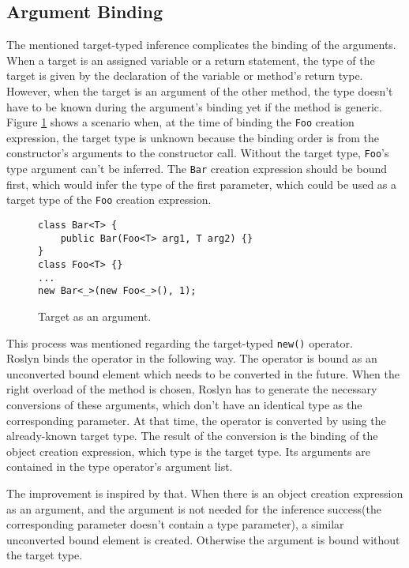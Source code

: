 \subsection{Argument Binding}

The mentioned target-typed inference complicates the binding of the arguments. 
When a target is an assigned variable or a return statement, the type of the target is given by the declaration of the variable or method’s return type. 
However, when the target is an argument of the other method, the type doesn’t have to be known during the argument's binding yet if the method is generic. 
Figure \ref{img60:target} shows a scenario when, at the time of binding the \texttt{Foo} creation expression, the target type is unknown because the binding order is from the constructor’s arguments to the constructor call. 
Without the target type, \texttt{Foo}'s type argument can’t be inferred. 
The \texttt{Bar} creation expression should be bound first, which would infer the type of the first parameter, which could be used as a target type of the \texttt{Foo} creation expression.
\begin{figure}[h!]
\begin{lstlisting}[style=csharp, mathescape=true]
class Bar<T> {
    public Bar(Foo<T> arg1, T arg2) {}
}
class Foo<T> {}
...
new Bar<_>(new Foo<_>(), 1);
\end{lstlisting}
\caption{Target as an argument.}
\label{img60:target}
\end{figure}
\par
This process was mentioned regarding the target-typed \texttt{new()} operator.\\ 
Roslyn binds the operator in the following way. The operator is bound as an unconverted bound element which needs to be converted in the future. 
When the right overload of the method is chosen, Roslyn has to generate the necessary conversions of these arguments, which don't have an identical type as the corresponding parameter. 
At that time, the operator is converted by using the already-known target type. 
The result of the conversion is the binding of the object creation expression, which type is the target type.
Its arguments are contained in the type operator’s argument list.
\par
The improvement is inspired by that. 
When there is an object creation expression as an argument, and the argument is not needed for the inference success(the corresponding parameter doesn't contain a type parameter), a similar unconverted bound element is created.
Otherwise the argument is bound without the target type.

